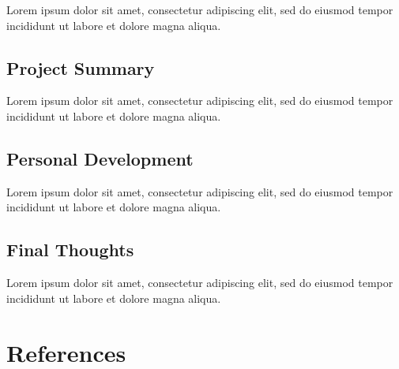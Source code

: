 \documentclass[12pt, a4paper]{article}
\begin{document}
Lorem ipsum dolor sit amet, consectetur adipiscing elit, sed do eiusmod tempor incididunt ut labore et dolore magna aliqua.


\subsection{Project Summary}


Lorem ipsum dolor sit amet, consectetur adipiscing elit, sed do eiusmod tempor incididunt ut labore et dolore magna aliqua.


\subsection{Personal Development}

Lorem ipsum dolor sit amet, consectetur adipiscing elit, sed do eiusmod tempor incididunt ut labore et dolore magna aliqua.


\subsection{Final Thoughts}

Lorem ipsum dolor sit amet, consectetur adipiscing elit, sed do eiusmod tempor incididunt ut labore et dolore magna aliqua.

\pagebreak


\section{References}


\end{document}
